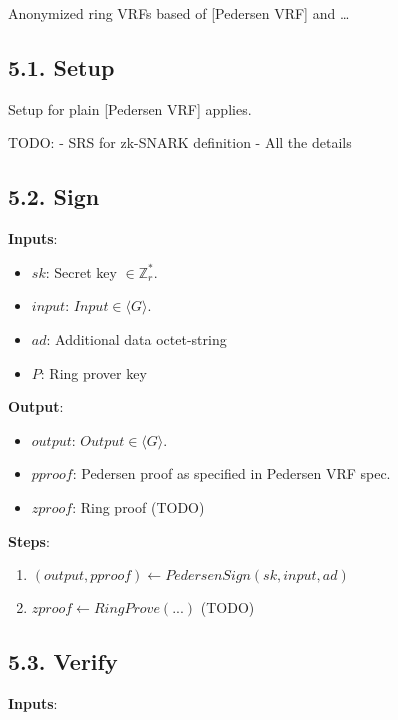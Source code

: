 \documentclass[
]{article}
\providecommand{\tightlist}{%
  \setlength{\itemsep}{0pt}\setlength{\parskip}{0pt}}
\begin{document}
Anonymized ring VRFs based of {[}Pedersen VRF{]} and \ldots{}

\hypertarget{setup-2}{%
\subsection{5.1. Setup}\label{setup-2}}

Setup for plain {[}Pedersen VRF{]} applies.

TODO: - SRS for zk-SNARK definition - All the details

\hypertarget{sign-2}{%
\subsection{5.2. Sign}\label{sign-2}}

\textbf{Inputs}:

\begin{itemize}
\tightlist
\item
  \(sk\): Secret key \(\in \mathbb{Z}^*_r\).
\item
  \(input\): \(Input \in \langle G \rangle\).
\item
  \(ad\): Additional data octet-string
\item
  \(P\): Ring prover key
\end{itemize}

\textbf{Output}:

\begin{itemize}
\tightlist
\item
  \(output\): \(Output \in \langle G \rangle\).
\item
  \(pproof\): Pedersen proof as specified in Pedersen VRF spec.
\item
  \(zproof\): Ring proof (TODO)
\end{itemize}

\textbf{Steps}:

\begin{enumerate}
\def\labelenumi{\arabic{enumi}.}
\tightlist
\item
  \((output, pproof) \leftarrow PedersenSign(sk, input, ad)\)
\item
  \(zproof \leftarrow RingProve(...)\) (TODO)
\end{enumerate}

\hypertarget{verify-2}{%
\subsection{5.3. Verify}\label{verify-2}}

\textbf{Inputs}:
\end{document}
